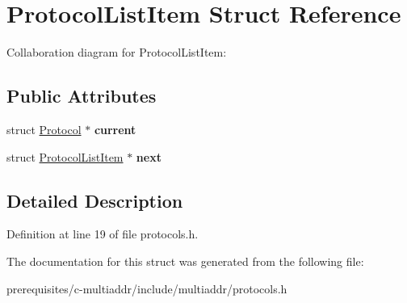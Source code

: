 \hypertarget{struct_protocol_list_item}{}\section{Protocol\+List\+Item Struct Reference}
\label{struct_protocol_list_item}


Collaboration diagram for Protocol\+List\+Item\+:
\subsection*{Public Attributes}
\begin{DoxyCompactItemize}
\item 
\mbox{\label{struct_protocol_list_item_afa92c69fcea9983d6c4ad07fa4836e67}} 
struct \mbox{\hyperlink{struct_protocol}{Protocol}} $\ast$ {\bfseries current}
\item 
\mbox{\label{struct_protocol_list_item_a80147a1132eb185d452ddfc211a636f1}} 
struct \mbox{\hyperlink{struct_protocol_list_item}{Protocol\+List\+Item}} $\ast$ {\bfseries next}
\end{DoxyCompactItemize}


\subsection{Detailed Description}


Definition at line 19 of file protocols.\+h.



The documentation for this struct was generated from the following file\+:\begin{DoxyCompactItemize}
\item 
prerequisites/c-\/multiaddr/include/multiaddr/protocols.\+h\end{DoxyCompactItemize}
